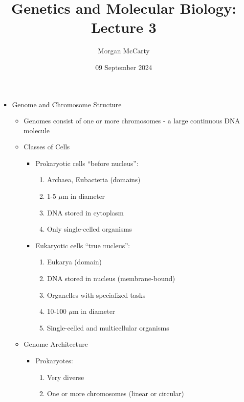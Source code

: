\documentclass[12pt]{article}
\title{
    Genetics and Molecular Biology: Lecture 3}
\author{Morgan McCarty}
\date{09 September 2024}
\begin{document}
    \maketitle

    \begin{itemize}
        \item Genome and Chromosome Structure
        \begin{itemize}
            \item Genomes consist of one or more chromosomes - a large continuous DNA molecule
            \item Classes of Cells
            \begin{itemize}
                \item Prokaryotic cells ``before nucleus'':
                \begin{enumerate}
                    \item Archaea, Eubacteria (domains)
                    \item 1-5 $\mu$m in diameter
                    \item DNA stored in cytoplasm
                    \item Only single-celled organisms
                \end{enumerate}
                \item Eukaryotic cells ``true nucleus'':
                \begin{enumerate}
                    \item Eukarya (domain)
                    \item DNA stored in nucleus (membrane-bound)
                    \item Organelles with specialized tasks
                    \item 10-100 $\mu$m in diameter
                    \item Single-celled and multicellular organisms
                \end{enumerate}
            \end{itemize}
            \item Genome Architecture
            \begin{itemize}
                \item Prokaryotes:
                \begin{enumerate}
                    \item Very diverse
                    \item One or more chromosomes (linear or circular)

\end{enumerate}
\end{itemize}
\end{itemize}
\end{itemize}
\end{document}
